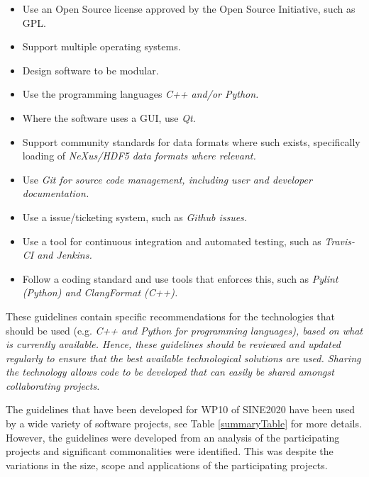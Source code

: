 \documentclass[jnr]{iosart2x}
\begin{document}
\begin{itemize}
      \item Use an Open Source license approved by the Open Source Initiative, such as GPL.
      \item Support multiple operating systems.
      \item Design software to be modular.
      \item Use the programming languages \it C++ and/or \it Python.
      \item Where the software uses a GUI, use \it Qt.
      \item Support community standards for data formats where such exists, specifically loading of \it NeXus/\it HDF5 data formats where relevant.
      \item Use \it Git for source code management, including user and developer documentation.
      \item Use a issue/ticketing system, such as \it Github issues.
      \item Use a tool for continuous integration and automated testing, such as \it Travis-CI and \it Jenkins.
      \item Follow a coding standard and use tools that enforces this, such as \it Pylint (\it Python) and \it ClangFormat (\it C++).
\end{itemize}

These guidelines contain specific recommendations for the technologies that should be used (e.g. \it C++ and \it Python for programming languages), based on what is currently available.
Hence, these guidelines should be reviewed and updated regularly to ensure that the best available technological solutions are used.
Sharing the technology allows code to be developed that can easily be shared amongst collaborating projects.

The guidelines that have been developed for WP10 of SINE2020 have been used by a wide variety of software projects, see Table \ref{summaryTable} for more details.
However, the guidelines were developed from an analysis of the participating projects and significant commonalities were identified.
This was despite the variations in the size, scope and applications of the participating projects.
\end{document}
